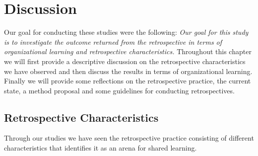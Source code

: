 \chapter{Discussion}
Our goal for conducting these studies were the following: \textit{Our goal for this study is to investigate the outcome returned from the retrospective in terms of organizational learning and retrospective characteristics.} Throughout this chapter we will first provide a descriptive discussion on the retrospective characteristics we have observed and then discuss the results in terms of organizational learning. Finally we will provide some reflections on the retrospective practice, the current state, a method proposal and some guidelines for conducting retrospectives. 

\section{Retrospective Characteristics}
Through our studies we have seen the retrospective practice consisting of different characteristics that identifies it as an arena for shared learning.


